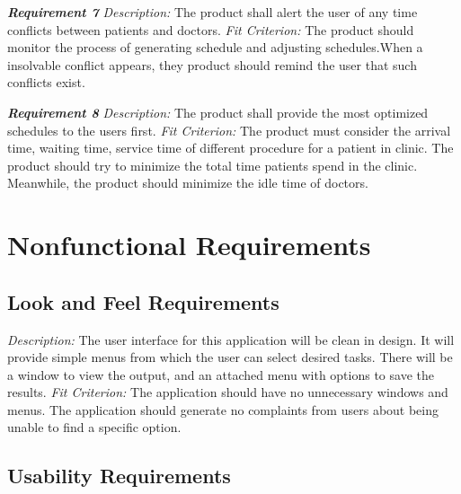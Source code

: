 \documentclass[12pt, titlepage]{article}
\begin{document}
\noindent\textbf{\textit{Requirement 7}}\newline
\textit{Description:}\newline
The product shall alert the user of any time conflicts between patients and doctors. \newline\newline
\textit{Fit Criterion:}\newline 
The product should monitor the process of generating schedule and adjusting schedules.When a insolvable conflict appears, they product should remind the user that such conflicts exist. \newline

\noindent\textbf{\textit{Requirement 8}}\newline
\textit{Description:}\newline
The product shall provide the most optimized schedules to the users first. \newline\newline
\textit{Fit Criterion:}\newline 
The product must consider the  arrival time, waiting time, service time of different procedure for a patient in clinic. The product should try to minimize the total time patients spend in the clinic. Meanwhile, the product should minimize the idle time of doctors. \newline

\section{Nonfunctional Requirements}
\subsection{Look and Feel Requirements}
\textit{Description:}\newline
The user interface for this application will be clean in design. It will provide simple menus from which the user can select desired tasks. There will be a window to view the output, and an attached menu with options to save the results. 
\newline \newline 
\textit{Fit Criterion:}\newline 
The application should have no unnecessary windows and menus.
The application should generate no complaints from users about being unable to find a specific option.
\subsection{Usability Requirements}
\end{document}
